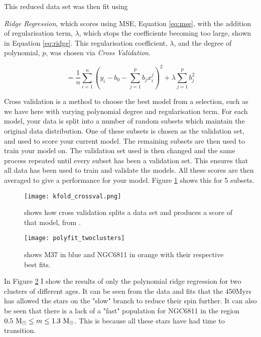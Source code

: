 \documentclass[fleqn,usenatbib]{mnras}
\begin{document}
This reduced data set was then fit using {\textit{Ridge Regression}, which scores using MSE, Equation \ref{eq:mse}, with the addition of regularisation term, $\lambda$, which stops the coefficients becoming too large, shown in Equation \ref{eq:ridge}.
This regularisation coefficient, $\lambda$, and the degree of polynomial, $p$, was chosen via \textit{Cross Validation}.

\begin{equation}
	\label{eq:ridge}
	 = \frac{1}{n}\sum_{i = 1}^n \left(y_i - b_0 - \sum_{j = 1}^p b_jx_i^j \right)^2 + \lambda \sum_{j = 1}^p b^2_j
\end{equation}

Cross validation is a method to choose the best model from a selection, such as we have here with varying polynomial degree and regularisation term.
For each model, your data is split into a number of random subsets which maintain the original data distribution.
One of these subsets is chosen as the validation set, and used to score your current model.
The remaining subsets are then used to train your model on.
The validation set used is then changed and the same process repeated until every subset has been a validation set.
This ensures that all data has been used to train and validate the models.
All these scores are then averaged to give a performance for your model.
Figure \ref{fig:cross_validation} shows this for 5 subsets.

\begin{figure}
	\texttt{[image: kfold\_crossval.png]}
	\caption{shows how cross validation splits a data set and produces a score of that model, from \protect\cite{CrossVal}.}
	\label{fig:cross_validation}
\end{figure}



\begin{figure}
	\texttt{[image: polyfit\_twoclusters]}
	\caption{shows M37 in blue and NGC6811 in orange with their respective best fits.}
	\label{fig:polyfit_twoclusters}
\end{figure}

In Figure \ref{fig:polyfit_twoclusters} I show the results of only the polynomial ridge regression for two clusters of different ages.
It can be seen from the data and fits that the 450Myrs has allowed the stars on the "slow" branch to reduce their spin further.
It can also be seen that there is a lack of a "fast" population for NGC6811 in the region $0.5~\textup{M}_\odot \leq m \leq 1.3~\textup{M}_\odot$.
This is because all these stars have had time to transition.

}
\end{document}
